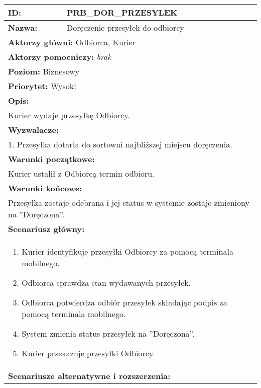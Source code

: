\begin{center}
\begin{longtable}[h]{|p{1.6cm}|p{13.5cm}|}
\hline
\textbf{ID:} & PRB\_DOR\_PRZESYLEK \\ \hline
\textbf{Nazwa:} & Doręczenie przesyłek do odbiorcy \\ \hline
\multicolumn{2}{|p{15.1cm}|}{\textbf{Aktorzy główni:}  Odbiorca, Kurier} \\
\multicolumn{2}{|p{15.1cm}|}{\textbf{Aktorzy pomocniczy:}  \textit{brak}} \\
\multicolumn{2}{|p{15.1cm}|}{\textbf{Poziom:}  Biznesowy} \\
\multicolumn{2}{|p{15.1cm}|}{\textbf{Priorytet:}  Wysoki} \\
\hline
\multicolumn{2}{|p{15.1cm}|}{\textbf{Opis:}} \\
\multicolumn{2}{|p{15.1cm}|}{Kurier wydaje przesyłkę Odbiorcy.
} \\ \hline
\multicolumn{2}{|p{15.1cm}|}{\textbf{Wyzwalacze:}} \\
\multicolumn{2}{|p{15.1cm}|}{
1. Przesyłka dotarła do sortowni najbliższej miejscu doręczenia.
} \\ \hline
\multicolumn{2}{|p{15.1cm}|}{\textbf{Warunki początkowe:}} \\
\multicolumn{2}{|p{15.1cm}|}{
Kurier ustalił z Odbiorcą termin odbioru.
} \\ \hline
\multicolumn{2}{|p{15.1cm}|}{\textbf{Warunki końcowe:}} \\
\multicolumn{2}{|p{15.1cm}|}{
Przesyłka zostaje odebrana i jej status w systemie zostaje zmieniony na ''Doręczona''.
} \\ \hline
\multicolumn{2}{|p{15.1cm}|}{\textbf{Scenariusz główny:}} \\
\multicolumn{2}{|p{15.1cm}|}{
\begin{enumerate}
\item Kurier identyfikuje przesyłki Odbiorcy za pomocą terminala mobilnego.
\item Odbiorca sprawdza stan wydawanych przesyłek.
\item Odbiorca potwierdza odbiór przesyłek składając podpis za pomocą terminala mobilnego.
\item System zmienia status przesyłek na ''Doręczona''.
\item Kurier przekazuje przesyłki Odbiorcy.
\end{enumerate}
} \\ \hline
\multicolumn{2}{|p{15.1cm}|}{\textbf{Scenariusze alternatywne i rozszerzenia:}} \\

\end{longtable}
\end{center}
